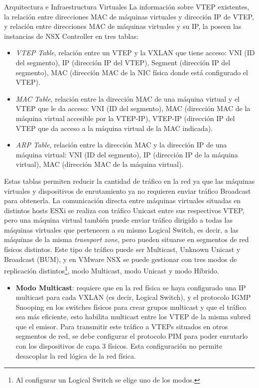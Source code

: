 \begin{subsection}{Arquitectura e Infraestructura Virtuales\cite{CFVirtInfraes}}
La información sobre VTEP existentes, la relación entre direcciones MAC de máquinas virtuales y dirección IP de VTEP, y relación entre direcciones MAC de máquinas virtuales y su IP, la poseen las instancias de NSX Controller en tres tablas: 
    \begin{itemize}
        \item \textit{VTEP Table}, relación entre un VTEP y la VXLAN que tiene acceso: VNI (ID del segmento), IP (dirección IP del VTEP), Segment (dirección IP del segmento), MAC (dirección MAC de la NIC física donde está configurado el VTEP).
        \item \textit{MAC Table}, relación entre la dirección MAC de una máquina virtual y el VTEP que le da acceso: VNI (ID del segmento), MAC (dirección MAC de la máquina virtual accesible por la VTEP-IP), VTEP-IP (dirección IP del VTEP que da acceso a la máquina virtual de la MAC indicada).
        \item \textit{ARP Table}, relación entre la dirección MAC y la dirección IP de una máquina virtual: VNI (ID del segmento), IP (dirección IP de la máquina virtual), MAC (dirección MAC de la máquina virtual).
    \end{itemize}
Estas tablas permiten reducir la cantidad de tráfico en la red ya que las máquinas virtuales y dispositivos de enrutamiento ya no requieren enviar tráfico Broadcast para obtenerla.
La comunicación directa entre máquinas virtuales situadas en distintos hosts ESXi se realiza con tráfico Unicast entre sus respectivos VTEP, pero una máquina virtual también puede enviar tráfico dirigido a todas las máquinas virtuales que pertenecen a su mismo Logical Switch, es decir, a las máquinas de la misma \textit{trasnport zone}, pero pueden situarse en segmentos de red físicos distintos. Este tipo de tráfico puede ser Multicast, Unknown Unicast y Broadcast (BUM), y en VMware NSX se puede gestionar con tres modos de replicación distintos\footnote{Al configurar un Logical Switch se elige uno de los modos.}, modo Multicast, modo Unicast y modo Híbrido.
    \begin{itemize}
        \item \textbf{Modo Multicast}: requiere que en la red física se haya configurado una IP multicast para cada VXLAN (es decir, Logical Switch), y el protocolo IGMP Snooping en los switches físicos para crear grupos multicast y que el tráfico sea más eficiente, esto habilita multicast entre los VTEP de la misma subred que el emisor. Para transmitir este tráfico a VTEPs situados en otros segmentos de red, se debe configurar el protocolo PIM para poder enrutarlo con los dispositivos de capa 3 físicos. Esta configuración no permite desacoplar la red lógica de la red física.\\

\end{itemize}
\end{subsection}
